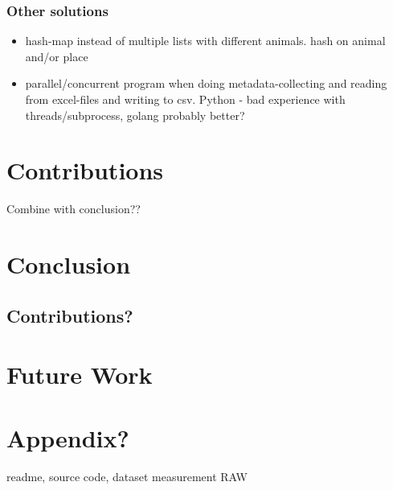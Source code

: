 \documentclass[USenglish]{uit-thesis}
\begin{document}
\subsection{Other solutions}
\begin{itemize}
\item hash-map instead of multiple lists with different animals. hash on animal and/or place
\item parallel/concurrent program when doing metadata-collecting and reading from excel-files and writing to csv. Python - bad experience with threads/subprocess, golang probably better?
\end{itemize}



\chapter{Contributions}
Combine with conclusion??
\chapter{Conclusion}
\section{Contributions?}

\chapter{Future Work}

\chapter{Appendix?}
readme, source code, dataset measurement RAW
\backmatter



\newpage{}
\end{document}
